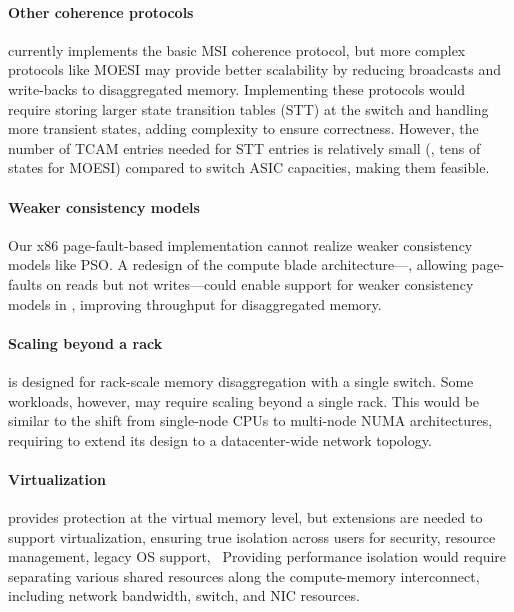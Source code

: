 \paragraph{Other coherence protocols} \mind currently implements the basic MSI coherence protocol, but more complex protocols like MOESI may provide better scalability by reducing broadcasts and write-backs to disaggregated memory. Implementing these protocols would require storing larger state transition tables (STT) at the switch and handling more transient states, adding complexity to ensure correctness. However, the number of TCAM entries needed for STT entries is relatively small (\eg, tens of states for MOESI) compared to switch ASIC capacities, making them feasible.

\paragraph{Weaker consistency models} Our x86 page-fault-based implementation cannot realize weaker consistency models like PSO. A redesign of the compute blade architecture—\eg, allowing page-faults on reads but not writes—could enable support for weaker consistency models in \mind, improving throughput for disaggregated memory.

\paragraph{Scaling beyond a rack} \mind is designed for rack-scale memory disaggregation with a single switch. Some workloads, however, may require scaling beyond a single rack. This would be similar to the shift from single-node CPUs to multi-node NUMA architectures, requiring \mind to extend its design to a datacenter-wide network topology.

\paragraph{Virtualization} \mind provides protection at the virtual memory level, but extensions are needed to support virtualization, ensuring true isolation across users for security, resource management, legacy OS support, \etc~Providing performance isolation would require separating various shared resources along the compute-memory interconnect, including network bandwidth, switch, and NIC resources.

